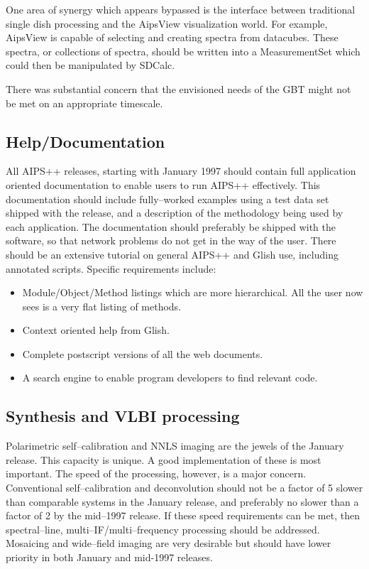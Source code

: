 One area of synergy which appears bypassed is the interface between
traditional single dish processing and the AipsView visualization
world.  For example, AipsView is capable of selecting and creating
spectra from datacubes. These spectra, or collections of spectra,
should be written into a MeasurementSet which could then be
manipulated by SDCalc.

There was substantial concern that the envisioned needs of the GBT
might not be met on an appropriate timescale.

\subsection{Help/Documentation}

All AIPS++ releases, starting with January 1997  should contain
full application oriented documentation to enable users to run AIPS++ 
effectively. This documentation should include fully--worked examples 
using a test data set shipped with the release, and a description of
the methodology being used by each application. The documentation should 
preferably be shipped with the software, so that network problems do
not get in the way of the user. There should be an extensive tutorial
on general AIPS++ and Glish use, including annotated scripts. Specific
requirements include:

\begin{itemize}
\item Module/Object/Method listings which are more hierarchical. All
the user now sees is a very flat listing of methods.

\item Context oriented help from Glish.

\item Complete postscript versions of all the web documents.

\item A search engine to enable program developers to find relevant code.
\end{itemize}

\subsection{Synthesis and VLBI processing}

Polarimetric self--calibration and NNLS imaging are the jewels of the
January release. This capacity is unique. A good implementation of
these is most important.  The speed of the processing, however, is a
major concern. Conventional self--calibration and deconvolution should
not be a factor of 5 slower than comparable systems in the January
release, and preferably no slower than a factor of 2 by the mid--1997
release. If these speed requirements can be met, then spectral--line,
multi--IF/multi--frequency processing should be addressed.  Mosaicing
and wide--field imaging are very desirable but should have lower priority
in both January and mid-1997 releases.

